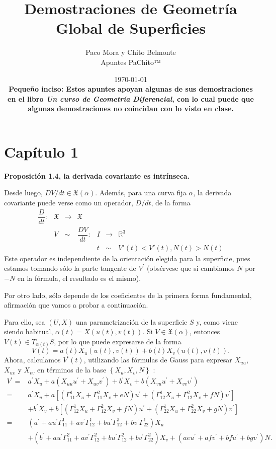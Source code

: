 \documentclass[openany]{book}
\title{Demostraciones de Geometría Global de Superficies}
\author{Paco Mora y Chito Belmonte\\Apuntes PaChito™}
\date{\today\\ \vspace{1cm}
\textbf{Pequeño inciso: Estos apuntes apoyan algunas de sus demostraciones en el libro \textit{Un curso de Geometría Diferencial}, con lo cual puede que algunas demostraciones no coincidan con lo visto en clase.}}
\begin{document}
\maketitle
\tableofcontents

\chapter{Capítulo 1}

\begin{center}
\textbf{Proposición 1.4, la derivada covariante es intrínseca.}
\end{center}

\begin{demonstration}
  Desde luego, $D V / d t \in \mathfrak{X}(\alpha)$. Además, para una curva fija $\alpha$, la derivada covariante puede verse como un operador, $D / d t$, de la forma
  $$
  \begin{array}{lllllll}
    \dfrac{D}{dt} : &  \mathfrak{X} & \to & \mathfrak{X} &&&\\
    & V & \sim & \dfrac{DV}{dt}: & I & \to & \mathbb{R}^{ 3 } \\
    &&&&t & \sim & V'(t)<V'(t), N(t)>N(t)
  \end{array}
  $$
Este operador es independiente de la orientación elegida para la superficie, pues estamos tomando sólo la parte tangente de $V^{\prime}$ (obsérvese que si cambiamos $N$ por $-N$ en la fórmula, el resultado es el mismo).

Por otro lado, sólo depende de los coeficientes de la primera forma fundamental, afirmación que vamos a probar a continuación.

Para ello, sea $(U, X)$ una parametrización de la superficie $S$ y, como viene siendo habitual, $\alpha(t)=X(u(t), v(t))$. Si $V \in \mathfrak{X}(\alpha)$, entonces $V(t) \in T_{\alpha(t)} S$, por lo que puede expresarse de la forma
$$
V(t)=a(t) X_{u}(u(t), v(t))+b(t) X_{v}(u(t), v(t)) .
$$
Ahora, calculamos $V^{\prime}(t)$, utilizando las fórmulas de Gauss para expresar $X_{u u}$, $X_{u v}$ y $X_{v v}$ en términos de la base $\left\{X_{u}, X_{v}, N\right\}$ :
$$
\begin{aligned}
V^{\prime}=& a^{\prime} X_{u}+a\left(X_{u u} u^{\prime}+X_{u v} v^{\prime}\right)+b^{\prime} X_{v}+b\left(X_{v u} u^{\prime}+X_{v v} v^{\prime}\right) \\
=& a^{\prime} X_{u}+a\left[\left(\Gamma_{11}^{1} X_{u}+\Gamma_{11}^{2} X_{v}+e N\right) u^{\prime}+\left(\Gamma_{12}^{1} X_{u}+\Gamma_{12}^{2} X_{v}+f N\right) v^{\prime}\right] \\
&+b^{\prime} X_{v}+b\left[\left(\Gamma_{12}^{1} X_{u}+\Gamma_{12}^{2} X_{v}+f N\right) u^{\prime}+\left(\Gamma_{22}^{1} X_{u}+\Gamma_{22}^{2} X_{v}+g N\right) v^{\prime}\right] \\
=&\left(a^{\prime}+a u^{\prime} \Gamma_{11}^{1}+a v^{\prime} \Gamma_{12}^{1}+b u^{\prime} \Gamma_{12}^{1}+b v^{\prime} \Gamma_{22}^{1}\right) X_{u} \\
&+\left(b^{\prime}+a u^{\prime} \Gamma_{11}^{2}+a v^{\prime} \Gamma_{12}^{2}+b u^{\prime} \Gamma_{12}^{2}+b v^{\prime} \Gamma_{22}^{2}\right) X_{v}+\left(a e u^{\prime}+a f v^{\prime}+b f u^{\prime}+b g v^{\prime}\right) N .
\end{aligned}
$$



\end{demonstration}
\end{document}
